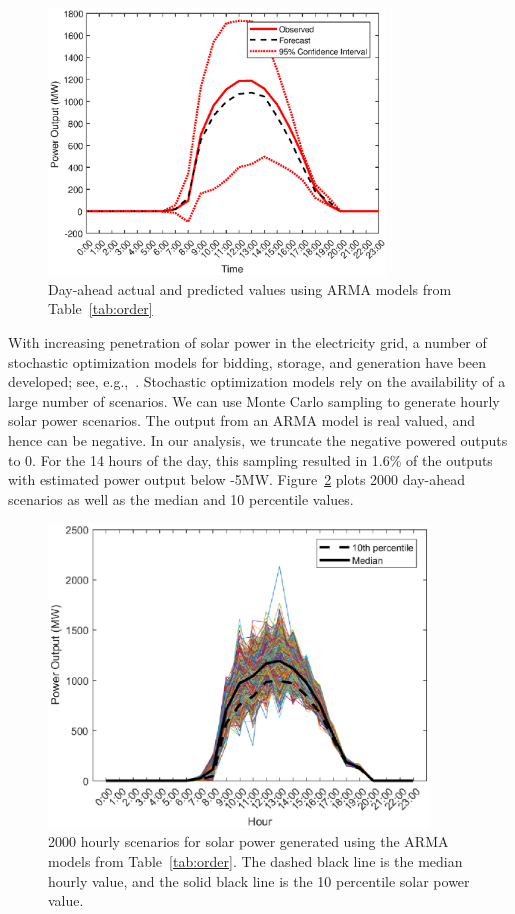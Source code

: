 \documentclass[review]{elsarticle}
\begin{document}
\begin{figure}[!t]
\centering
\includegraphics[width=0.8\textwidth]{prediction.eps}
\caption{Day-ahead actual and predicted values using ARMA models from 
Table~\ref{tab:order}}
 \label{fig:prediction}
\end{figure}

With increasing penetration of solar power in the electricity grid, a number of 
stochastic optimization models for bidding, storage, and generation have been 
developed; see, e.g.,~\cite{banos2011optimization,sharma2012stochastic}. 
Stochastic optimization models rely on the availability of a large number of 
scenarios.  We can use Monte Carlo sampling to generate hourly solar power 
scenarios. The output from an ARMA model is real valued, and hence can be 
negative. In our analysis, we truncate the negative powered outputs to 0. For 
the 14 hours of 
the day, this sampling resulted in 1.6\% of the outputs with estimated power 
output below -5MW. Figure~\ref{fig:sample} plots 2000 day-ahead scenarios 
as well as the median and 10 percentile values. 


\begin{figure}[!t]
\centering
\includegraphics[width=0.9\textwidth]{sample_smooth.eps}
\caption{2000 hourly scenarios for solar power generated using the ARMA models 
from Table~\ref{tab:order}. The dashed black line is the median hourly value, 
and the solid black line is
the 10 percentile solar power value.}
 \label{fig:sample}
\end{figure}
\end{document}
